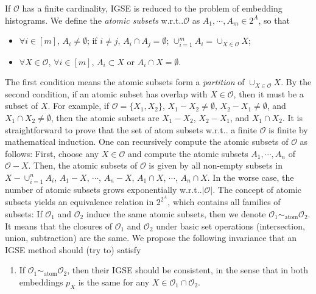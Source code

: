 \documentclass{article}
\makeatletter
\DeclareRobustCommand\onedot{\futurelet\@let@token\bmv@onedotaux}
\def\bmv@onedotaux{\ifx\@let@token.\else.\null\fi\xspace}
\def\wrt{w.r.t\onedot} \def\Wrt{W.r.t\onedot}
\makeatother
\begin{document}
If $\mathcal{O}$ has a finite cardinality, IGSE is reduced to the problem of embedding histograms.
We define the \emph{atomic subsets} \wrt $\mathcal{O}$ as $A_1,\cdots,A_m\in2^A$, so that
\begin{itemize}
\item $\forall{i}\in[m]$, $A_i\neq\emptyset$; if $i\neq{j}$, $A_i\cap{A_j}=\emptyset$; $\cup_{i=1}^mA_i = \cup_{X\in\mathcal{O}}X$;
\item $\forall{X}\in\mathcal{O}$, $\forall{i}\in[m]$,
$A_i\subset{X}$ or $A_i\cap{X}=\emptyset$.
\end{itemize}
The first condition means the atomic subsets form a \emph{partition} of
$\cup_{X\in\mathcal{O}}X$. By the second condition, if an atomic subset
has overlap with $X\in\mathcal{O}$, then it must be a subset of $X$.
For example, if $\mathcal{O}=\{X_1,X_2\}$,
$X_1-X_2\neq\emptyset$, $X_2-X_1\neq\emptyset$, and $X_1\cap{X}_2\neq\emptyset$, then
the atomic subsets are $X_1-X_2$, $X_2-X_1$, and $X_1\cap{X}_2$.
It is straightforward to prove that the set of atom subsets \wrt
a finite $\mathcal{O}$ is finite by mathematical induction.
One can recursively compute the atomic subsets of $\mathcal{O}$ as follows:
First, choose any $X\in\mathcal{O}$ and compute the atomic subsets $A_1,\cdots,A_{n}$
of $\mathcal{O}-X$. Then, the atomic subsets of $\mathcal{O}$ is given by all
non-empty subsets in $X-\cup_{i=1}^nA_{i}$, $A_1-X$, $\cdots$, $A_n-X$,
$A_1\cap{}X$, $\cdots$, $A_n\cap{}X$. In the worse case, the number of atomic
subsets grows exponentially \wrt $\vert\mathcal{O}\vert$.
The concept of atomic subsets yields an equivalence relation in $2^{2^A}$,
which contains all families of subsets:
If $\mathcal{O}_1$ and $\mathcal{O}_2$ induce the same atomic subsets,
then we denote $\mathcal{O}_1\sim_{\mathrm{atom}}\mathcal{O}_2$.
It means that the closures of $\mathcal{O}_1$ and $\mathcal{O}_2$ under
basic set operations (intersection, union, subtraction) are the same.
We propose the following invariance that an IGSE method should (try to) satisfy
\begin{enumerate}
\item[\ding{194}]
If $\mathcal{O}_1\sim_{\mathrm{atom}}\mathcal{O}_2$, then their IGSE should be
consistent, in the sense that in both embeddings $p_X$ is the same for any
$X\in\mathcal{O}_1\cap\mathcal{O}_2$.
\end{enumerate}
\end{document}
